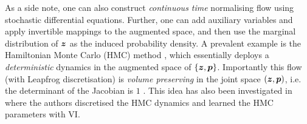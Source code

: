 As a side note, one can also construct \emph{continuous time} normalising flow using stochastic differential equations. Further, one can add auxiliary variables and apply invertible mappings to the augmented space, and then use the marginal distribution of $\bm{z}$ as the induced probability density. A prevalent example is the Hamiltonian Monte Carlo (HMC) method \citep{neal:mcmc2011}, which essentially deploys a \emph{deterministic} dynamics in the augmented space of $\{\bm{z}, \bm{p} \}$. Importantly this flow (with Leapfrog discretisation) is \emph{volume preserving} in the joint space $(\bm{z}, \bm{p})$, i.e. the determinant of the Jacobian is $1$ \citep{neal:mcmc2011}. This idea has also been investigated in \citet{salimans:mcmcvi2015} where the authors discretised the HMC dynamics and learned the HMC parameters with VI. 
 